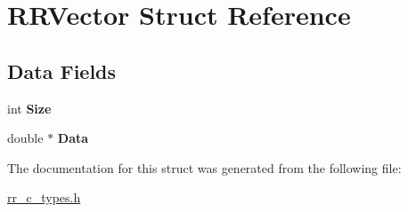 \hypertarget{struct_r_r_vector}{
\section{\-R\-R\-Vector \-Struct \-Reference}
\label{struct_r_r_vector}
}
\subsection*{\-Data \-Fields}
\begin{DoxyCompactItemize}
\item 
\hypertarget{struct_r_r_vector_af06eb7b9b70be91dadd4f12ebcaed796}{
int {\bfseries \-Size}}
\label{struct_r_r_vector_af06eb7b9b70be91dadd4f12ebcaed796}

\item 
\hypertarget{struct_r_r_vector_a7c5cbda3aa940f4b0d6e8a1679307dfc}{
double $\ast$ {\bfseries \-Data}}
\label{struct_r_r_vector_a7c5cbda3aa940f4b0d6e8a1679307dfc}

\end{DoxyCompactItemize}


\-The documentation for this struct was generated from the following file\-:\begin{DoxyCompactItemize}
\item 
\hyperlink{rr__c__types_8h}{rr\-\_\-c\-\_\-types.\-h}\end{DoxyCompactItemize}
